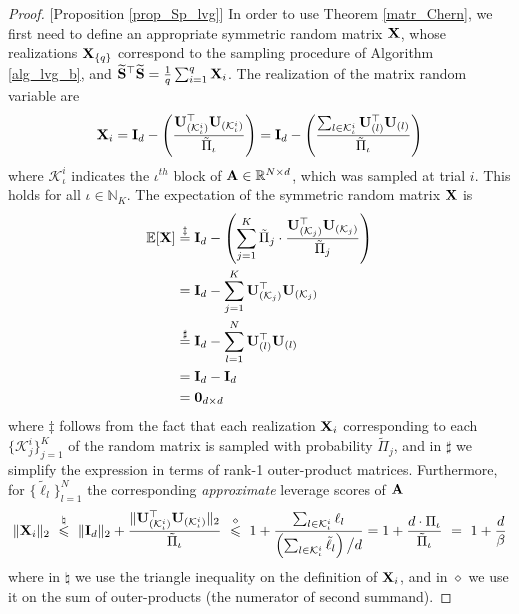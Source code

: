 \documentclass[journal,letterpaper,onecolumn,twoside,nofonttune]{IEEEtran}
\newcommand{\N}{\mathbb{N}}
\newcommand{\R}{\mathbb{R}}
\newcommand{\E}{\mathbb{E}}
\newcommand{\K}{\mathcal{K}}
\newcommand{\Ub}{\bold{U}}
\newcommand{\Ab}{\bold{A}}
\newcommand{\Ib}{\bold{I}}
\newcommand{\Sb}{\bold{S}}
\newcommand{\Sbwt}{\widetilde{\Sb}}
\newcommand{\Xb}{\bold{X}}
\newcommand{\Pit}{\tilde{\Pi}}
\newcommand{\ellt}{\tilde{\ell}}
\begin{document}
\begin{proof}{[Proposition \ref{prop_Sp_lvg}]}
In order to use Theorem \ref{matr_Chern}, we first need to define an appropriate symmetric random matrix $\Xb$, whose realizations $\Xb_{\{q\}}$ correspond to the sampling procedure of Algorithm \ref{alg_lvg_b}, and $\Sbwt^\top\Sbwt=\frac{1}{q}\sum_{i=1}^q\Xb_i$. The realization of the matrix random variable are
$$ \Xb_i=\Ib_d-\left(\frac{\Ub_{\left(\K_\iota^i\right)}^\top\Ub_{\left(\K_\iota^i\right)}}{\Pit_\iota}\right)=\Ib_d-\left(\frac{\sum_{l\in\K_\iota^i}\Ub_{(l)}^\top\Ub_{(l)}}{\Pit_\iota}\right) $$
where $\K_\iota^i$ indicates the $\iota^{th}$ block of $\Ab\in\R^{N\times d}$, which was sampled at trial $i$. This holds for all $\iota\in\N_K$. The expectation of the symmetric random matrix $\Xb$ is
\begin{align*}
  \E[\Xb] &\overset{\ddagger}{=} \Ib_d-\left(\sum_{j=1}^K\Pit_j\cdot\frac{\Ub_{(\K_j)}^\top\Ub_{(\K_j)}}{\Pit_j}\right)\\
  &= \Ib_d-\sum_{j=1}^K\Ub_{(\K_j)}^\top\Ub_{(\K_j)}\\
  &\overset{\sharp}{=} \Ib_d-\sum_{l=1}^N \Ub_{(l)}^\top\Ub_{(l)}\\
  &= \Ib_d-\Ib_d\\
  &=\bold{0}_{d\times d}
\end{align*}
where $\ddagger$ follows from the fact that each realization $\Xb_i$ corresponding to each $\{\K_j^i\}_{j=1}^K$ of the random matrix is sampled with probability $\Pit_j$, and in $\sharp$ we simplify the expression in terms of rank-1 outer-product matrices. Furthermore, for $\{\ellt_l\}_{l=1}^N$ the corresponding \textit{approximate} leverage scores of $\Ab$
$$ \|\Xb_i\|_2 \ \overset{\natural} {\leqslant} \ \|\Ib_d\|_2+\frac{\|\Ub_{\left(\K_\iota^i\right)}^\top\Ub_{\left(\K_\iota^i\right)}\|_2}{\Pit_\iota} \ \overset{\diamond}{\leqslant} \ 1+\frac{\sum_{l\in\K_\iota^i}\ell_l}{\left(\sum_{l\in\K_\iota^i}\ellt_l\right)\big/d} = 1+\frac{d\cdot\Pi_\iota}{\Pit_\iota} \ = \ 1+\frac{d}{\beta} $$
where in $\natural$ we use the triangle inequality on the definition of $\Xb_i$, and in $\diamond$ we use it on the sum of outer-products (the numerator of second summand).


\end{proof}
\end{document}
